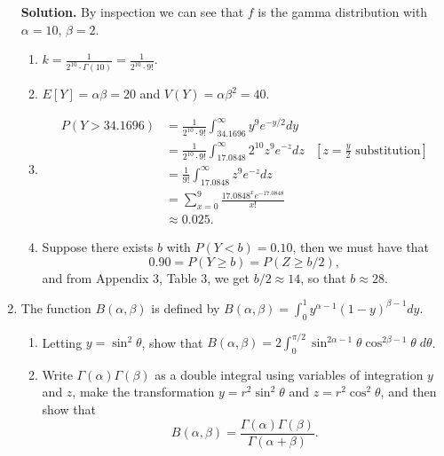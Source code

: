 \documentclass[9pt]{article}
\newcommand{\D}{\displaystyle}
\begin{document}
\begin{enumerate}
      \textbf{Solution.} By inspection we can see that $f$ is the gamma 
      distribution with $\alpha = 10$, $\beta = 2$.
      \begin{enumerate}
         \item $\D k = \frac{1}{2^{10} \cdot \Gamma(10)} =
               \frac{1}{2^{10} \cdot 9!}$.
         \item $E[Y] = \alpha\beta = 20$ and $V(Y) = \alpha\beta^2 = 40$.
         \item \begin{align*}
                  P(Y > 34.1696) &= \frac{1}{2^{10} \cdot 9!}
                     \int_{34.1696}^\infty y^9e^{-y/2} dy \\
                     &= \frac{1}{2^{10} \cdot 9!}
                     \int_{17.0848}^\infty 2^{10}z^9e^{-z} dz
                     &\left[z = \frac{y}{2} \text{ substitution}\right]  \\
                     &= \frac{1}{9!}
                     \int_{17.0848}^\infty z^9e^{-z} dz \\
                     &= \sum_{x=0}^9\frac{17.0848^xe^{-17.0848}}{x!} \\
                     &\approx 0.025.
               \end{align*}
         \item Suppose there exists $b$ with $P(Y < b) = 0.10$, then we must
               have that
               $$0.90 = P(Y \ge b) = P(Z \ge b/2),$$
               and from Appendix 3, Table 3, we get $b/2 \approx 14$, so that
               $b \approx 28$.
      \end{enumerate}
   \item The function $B(\alpha, \beta)$ is defined by
         $\D B(\alpha, \beta) = \int_0^1y^{\alpha - 1}(1 - y)^{\beta - 1} dy$.
         \begin{enumerate}
            \item Letting $y = \sin^2\theta$, show that
                  $\D B(\alpha, \beta) = 2\int_0^{\pi/2}\sin^{2\alpha - 1}\theta
                  \cos^{2\beta - 1}\theta\;d\theta$.
            \item Write $\Gamma(\alpha)\Gamma(\beta)$ as a double integral using
                  variables of integration $y$ and $z$, make the transformation
                  $y = r^2\sin^2\theta$ and $z = r^2\cos^2\theta$, and then show 
                  that
                  $$B(\alpha, \beta) = \D\frac{\Gamma(\alpha)\Gamma(\beta)}
                   {\Gamma(\alpha +\beta)}.$$
         \end{enumerate}


\end{enumerate}
\end{document}
